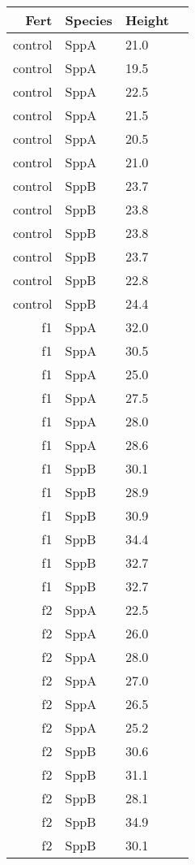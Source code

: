 \documentclass[11pt]{article}
\begin{document}
    \begin{tabular}{|r|l|l|l|}
 Fert & Species & Height\\
\hline
	 control & SppA    & 21.0   \\
	 control & SppA    & 19.5   \\
	 control & SppA    & 22.5   \\
	 control & SppA    & 21.5   \\
	 control & SppA    & 20.5   \\
	 control & SppA    & 21.0   \\
	 control & SppB    & 23.7   \\
	 control & SppB    & 23.8   \\
	 control & SppB    & 23.8   \\
	 control & SppB    & 23.7   \\
	 control & SppB    & 22.8   \\
	 control & SppB    & 24.4   \\
	 f1      & SppA    & 32.0   \\
	 f1      & SppA    & 30.5   \\
	 f1      & SppA    & 25.0   \\
	 f1      & SppA    & 27.5   \\
	 f1      & SppA    & 28.0   \\
	 f1      & SppA    & 28.6   \\
	 f1      & SppB    & 30.1   \\
	 f1      & SppB    & 28.9   \\
	 f1      & SppB    & 30.9   \\
	 f1      & SppB    & 34.4   \\
	 f1      & SppB    & 32.7   \\
	 f1      & SppB    & 32.7   \\
	 f2      & SppA    & 22.5   \\
	 f2      & SppA    & 26.0   \\
	 f2      & SppA    & 28.0   \\
	 f2      & SppA    & 27.0   \\
	 f2      & SppA    & 26.5   \\
	 f2      & SppA    & 25.2   \\
	 f2      & SppB    & 30.6   \\
	 f2      & SppB    & 31.1   \\
	 f2      & SppB    & 28.1   \\
	 f2      & SppB    & 34.9   \\
	 f2      & SppB    & 30.1   \\

\end{tabular}
\end{document}
